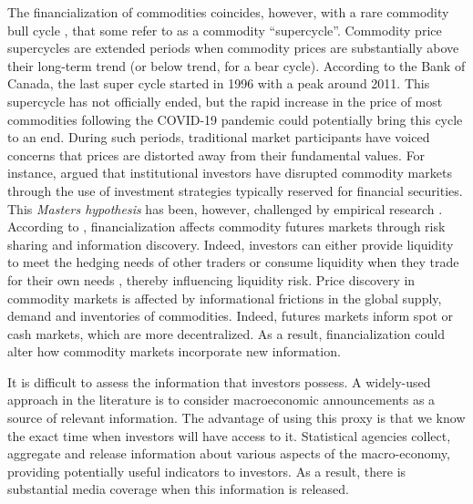 \documentclass[12pt]{article}
\begin{document}
The financialization of commodities coincides, however, with a rare commodity bull cycle \cite{humphreys2010great}, that some refer to as a commodity ``supercycle''. Commodity price supercycles are extended periods when commodity prices are substantially above their long-term trend (or below trend, for a bear cycle). According to the Bank of Canada, the last super cycle started in 1996 with a peak around 2011. This supercycle has not officially ended, but the rapid increase in the price of most commodities following the COVID-19 pandemic could potentially bring this cycle to an end. During such periods, traditional market participants have voiced concerns that prices are distorted  away from their fundamental values. For instance, \citet{masters2009testimony} argued  that institutional investors have disrupted commodity markets through the use of investment strategies typically reserved for financial securities. This \emph{Masters hypothesis} has been, however, challenged by empirical research \citep{irwin2011index,irwin2012testing,irwin2012financialization}. According to \citet{cheng2014financialization}, financialization affects commodity futures markets through risk sharing and information discovery. Indeed, investors can either provide liquidity to meet the hedging needs of other traders or consume liquidity when they trade for their own needs \citep{kang2020tale} , thereby influencing liquidity risk. Price discovery in commodity markets is affected by informational frictions in the global supply, demand and inventories of commodities. Indeed, futures markets inform spot or cash markets, which are more decentralized. As a result, financialization could alter how commodity markets incorporate new information.

It is difficult to assess the information that investors possess. A widely-used approach in the literature is to consider macroeconomic announcements as a source of relevant information. The advantage of using this proxy is that we know the exact time when investors will have access to it. Statistical agencies collect, aggregate and release information about various aspects of the macro-economy, providing potentially useful indicators to investors. As a result, there is substantial media coverage when this information is released.
\end{document}
